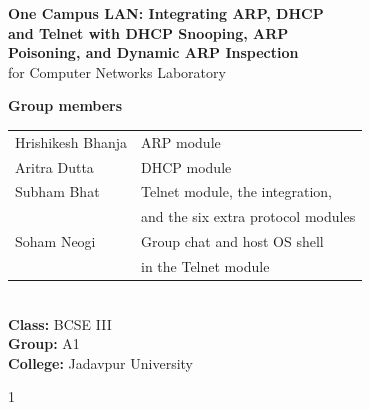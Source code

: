 \documentclass[11pt,a4paper]{article}
\begin{document}
\begin{titlepage}
    \centering
    \vspace*{4.2cm}

    {\LARGE \textbf{One Campus LAN: Integrating ARP, DHCP}}\\[0.7em]
    {\LARGE \textbf{and Telnet with DHCP Snooping, ARP}}\\[0.7em]
    {\LARGE \textbf{Poisoning, and Dynamic ARP Inspection}}\\[1.4em]

    {\large for Computer Networks Laboratory}

    \vspace{3.8cm}

    {\large \textbf{Group members}}\\[0.8em]
    {\large
    \begin{tabular}{@{}ll@{}}
    Hrishikesh Bhanja & ARP module \\[0.35em]
    Aritra Dutta & DHCP module \\[0.35em]
    Subham Bhat & Telnet module, the integration, \\
     & and the six extra protocol modules \\[0.35em]
    Soham Neogi & Group chat and host OS shell \\
     & in the Telnet module \\
    \end{tabular}}\\[1.4em]
    {\large
    \textbf{Class:} BCSE III\\[0.55em]
    \textbf{Group:} A1\\[0.55em]
    \textbf{College:} Jadavpur University
    }

    \vfill
    {\normalsize 1}
\end{titlepage}

\setcounter{page}{2}
\tableofcontents
\newpage

\setcounter{page}{3}
\end{document}
